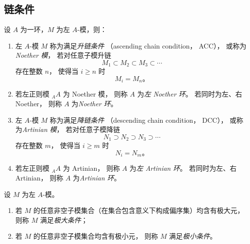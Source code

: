 \subsection{链条件}
\begin{definition}
    设 $A$ 为一环，$M$ 为左 $A$-模，则：
    \begin{enumerate}
        \item
              左 $A$-模 $M$ 称为满足\emph{升链条件}
              （ascending chain condition， ACC），
              或称为\emph{Noether 模}，
              若对任意子模升链
              \[
                  M_1\subset M_2\subset M_3\subset\cdots
              \]
              存在整数 $n$，
              使得当 $i\ge n$ 时
              \[
                  M_i=M_n。
              \]

        \item
              若左正则模 ${}_A A$ 为 Noether 模，
              则称 $A$ 为\emph{左 Noether 环}。
              若同时为左、右 Noether，
              则称 $A$ 为\emph{Noether 环}。

        \item
              左 $A$-模 $M$ 称为满足\emph{降链条件}
              （descending chain condition， DCC），
              或称为\emph{Artinian 模}，
              若对任意子模降链
              \[
                  N_1\supset N_2\supset N_3\supset\cdots
              \]
              存在整数 $m$，
              使得当 $i\ge m$ 时
              \[
                  N_i=N_m。
              \]

        \item
              若左正则模 ${}_A A$ 为 Artinian，
              则称 $A$ 为\emph{左 Artinian 环}。
              若同时为左、右 Artinian，
              则称 $A$ 为\emph{Artinian 环}。
    \end{enumerate}
\end{definition}

\begin{definition}
    设 $M$ 为左 $A$-模。
    \begin{enumerate}
        \item
              若 $M$ 的任意非空子模集合（在集合包含意义下构成偏序集）均含有极大元，
              则称 $M$ 满足\emph{极大条件}；
        \item
              若 $M$ 的任意非空子模集合均含有极小元，
              则称 $M$ 满足\emph{极小条件}。
    \end{enumerate}
\end{definition}

